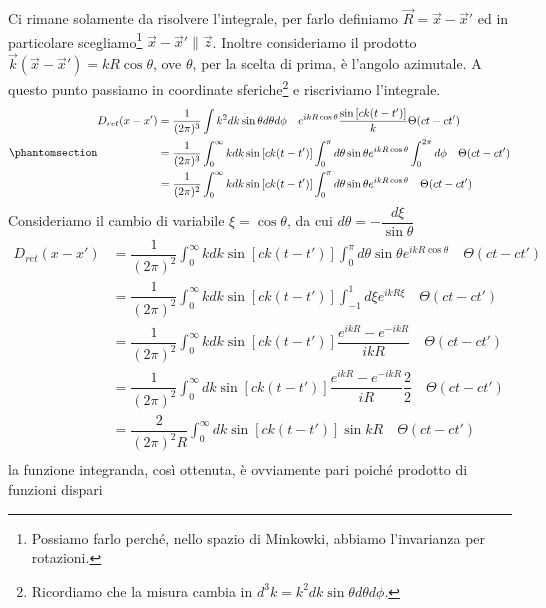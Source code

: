 Ci rimane solamente da risolvere l'integrale, per farlo definiamo $\Vec{R}=\Vec{x}-\Vec{x}'$ ed in particolare scegliamo\footnote{Possiamo farlo perché, nello spazio di Minkowki, abbiamo l'invarianza per rotazioni.} $\Vec{x}-\Vec{x}'\parallel \Vec{z}$. Inoltre consideriamo il prodotto $\Vec{k}(\Vec{x}-\Vec{x}')=kR\cos{\theta}$, ove $\theta$, per la scelta di prima, è l'angolo azimutale. A questo punto passiamo in coordinate sferiche\footnote{Ricordiamo che la misura cambia in $d^3k=k^2dk\sin{\theta}d\theta d\phi$.} e riscriviamo l'integrale.
\begin{equation}\phantomsection\label{eq:ret_green}
   \begin{aligned}
        D_{ret}(x-x')&=\dfrac{1}{(2\pi)^3}\int k^2dk\sin{\theta}d\theta d\phi \quad e^{ikR\cos{\theta}}\dfrac{\sin{[ck(t-t')]}}{k}\Theta(ct-ct')\\
        &=\dfrac{1}{(2\pi)^3}\int_0^\infty kdk\sin{[ck(t-t')]}\int_0^\pi d\theta \sin{\theta}e^{ikR\cos{\theta}} \int_0^{2\pi}d\phi \quad\Theta(ct-ct')\\
        &=\dfrac{1}{(2\pi)^2}\int_0^\infty kdk\sin{[ck(t-t')]}\int_0^\pi d\theta \sin{\theta}e^{ikR\cos{\theta}}  \quad\Theta(ct-ct')
   \end{aligned}
\end{equation}
Consideriamo il cambio di variabile $\xi=\cos{\theta}$, da cui $d\theta=-\dfrac{d\xi}{\sin{\theta}}$
\begin{equation}
   \begin{aligned}
        D_{ret}(x-x')&=\dfrac{1}{(2\pi)^2}\int_0^\infty kdk\sin{[ck(t-t')]}\int_0^\pi d\theta \sin{\theta}e^{ikR\cos{\theta}}  \quad\Theta(ct-ct')\\
        &=\dfrac{1}{(2\pi)^2}\int_0^\infty kdk\sin{[ck(t-t')]}\int_{-1}^1 d\xi e^{ikR\xi}  \quad\Theta(ct-ct')\\
        &=\dfrac{1}{(2\pi)^2}\int_0^\infty kdk\sin{[ck(t-t')]} \dfrac{e^{ikR}-e^{-ikR}}{ikR}  \quad\Theta(ct-ct')\\
         &=\dfrac{1}{(2\pi)^2}\int_0^\infty dk\sin{[ck(t-t')]} \dfrac{e^{ikR}-e^{-ikR}}{iR} \dfrac{2}{2} \quad\Theta(ct-ct')\\
          &=\dfrac{2}{(2\pi)^2R}\int_0^\infty dk\sin{[ck(t-t')]} \sin{kR}  \quad\Theta(ct-ct')\\
   \end{aligned}
\end{equation}
la funzione integranda, così ottenuta, è ovviamente pari poiché prodotto di funzioni dispari

